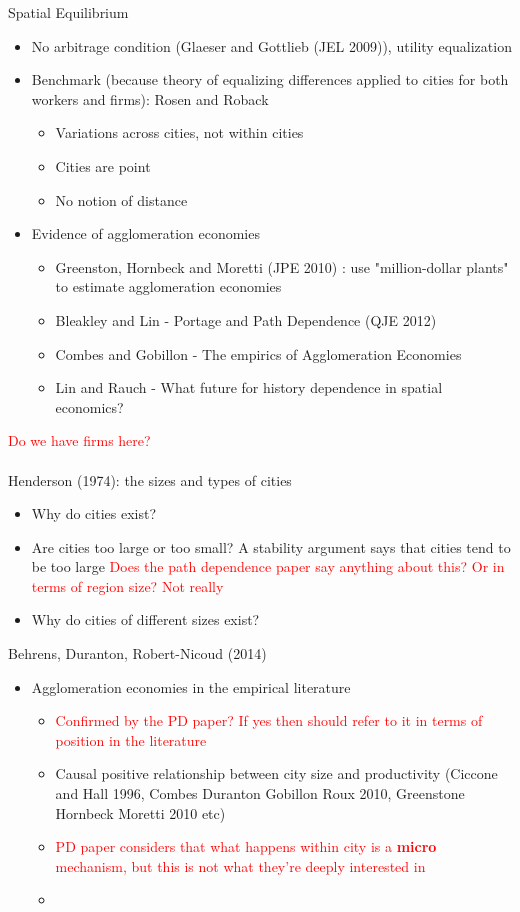 \documentclass[12pt, final]{article}
\begin{document}
Spatial Equilibrium
\begin{itemize}
    \item No arbitrage condition (Glaeser and Gottlieb (JEL 2009)), utility equalization
    \item Benchmark (because theory of equalizing differences applied to cities for both workers and firms): Rosen and Roback 
    \begin{itemize}
        \item Variations across cities, not within cities
        \item Cities are point
        \item No notion of distance
    \end{itemize}
    \item Evidence of agglomeration economies
    \begin{itemize}
        \item Greenston, Hornbeck and Moretti (JPE 2010) : use "million-dollar plants" to estimate agglomeration economies
        \item Bleakley and Lin - Portage and Path Dependence (QJE 2012)
        \item Combes and Gobillon - The empirics of Agglomeration Economies
        \item Lin and Rauch - What future for history dependence in spatial economics?
    \end{itemize}
\end{itemize}


\textcolor{red}{Do we have firms here?}
\\
\\
Henderson (1974): the sizes and types of cities
\begin{itemize}
    \item Why do cities exist?
    \item Are cities too large or too small? A stability argument says that cities tend to be too large \textcolor{red}{Does the path dependence paper say anything about this? Or in terms of region size? Not really}
    \item Why do cities of different sizes exist?
\end{itemize}


Behrens, Duranton, Robert-Nicoud (2014)
\begin{itemize}
    \item Agglomeration economies in the empirical literature
    \begin{itemize}
        \item \textcolor{red}{Confirmed by the PD paper? If yes then should refer to it in terms of position in the literature}
        \item Causal positive relationship between city size and productivity (Ciccone and Hall 1996, Combes Duranton Gobillon Roux 2010, Greenstone Hornbeck Moretti 2010 etc)
        \item \textcolor{red}{PD paper considers that what happens within city is a \textbf{micro} mechanism, but this is not what they're deeply interested in}
        \item 
    \end{itemize}
\end{itemize}
\end{document}
